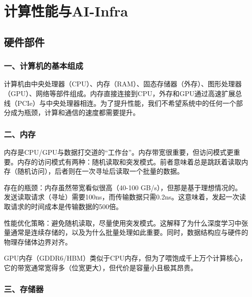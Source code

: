 \hypertarget{ux8ba1ux7b97ux6027ux80fdux4e0eai-infra}{%
\chapter{计算性能与AI-Infra}\label{ux8ba1ux7b97ux6027ux80fdux4e0eai-infra}}

\hypertarget{ux786cux4ef6ux90e8ux4ef6}{%
\section{硬件部件}\label{ux786cux4ef6ux90e8ux4ef6}}

\hypertarget{ux4e00ux8ba1ux7b97ux673aux7684ux57faux672cux7ec4ux6210}{%
\subsection{一、计算机的基本组成}\label{ux4e00ux8ba1ux7b97ux673aux7684ux57faux672cux7ec4ux6210}}

计算机由中央处理器（CPU）、内存（RAM）、固态存储器（外存）、图形处理器（GPU）、网络等部件组成。内存直接连接到CPU，外存和GPU通过高速扩展总线（PCIe）与中央处理器相连。为了提升性能，我们不希望系统中的任何一个部分成为瓶颈，计算和通信的速度都需要提升。

\hypertarget{ux4e8cux5185ux5b58}{%
\subsection{二、内存}\label{ux4e8cux5185ux5b58}}

内存是CPU/GPU与数据打交道的``工作台''。内存带宽很重要，但访问模式更重要。内存的访问模式有两种：随机读取和突发模式。前者意味着总是跳跃着读取内存（随机访问），后者则在一次寻址后读取一个批量的数据。

存在的瓶颈：内存虽然带宽看似很高（40-100 GB/s），但那是基于理想情况的。发送读取请求（寻址）需要100ns，而传输数据只需0.2ns。这意味着，发起一次读取请求的时间成本是传输数据的500倍。

性能优化策略：避免随机读取，尽量使用突发模式。这解释了为什么深度学习中张量通常是连续存储的，以及为什么批量处理如此重要。同时，数据结构应与硬件的物理存储体边界对齐。

GPU内存（GDDR6/HBM）类似于CPU内存，但为了喂饱成千上万个计算核心，它的带宽通常宽得多（位宽更大），但代价是容量小且极其昂贵。

\hypertarget{ux4e09ux5b58ux50a8ux5668}{%
\subsection{三、存储器}\label{ux4e09ux5b58ux50a8ux5668}}

